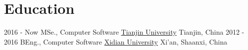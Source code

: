\documentclass[letterpaper]{twentysecondcv} %
\begin{document}
\makeprofile %

\section{Education}

\begin{twenty} %
	\twentyitem
    	{2016 - Now}
        {MSe., Computer Software}
        {\href{http://tju.edu.cn/}{Tianjin University}}
        {Tianjin, China}
        {}
    \twentyitem
    	{2012 - 2016}
        {BEng., Computer Software}
        {\href{http://www.xidian.edu.cn/}{Xidian University}}
        {Xi'an, Shaanxi, China}
        {}
\end{twenty}




\end{document}
